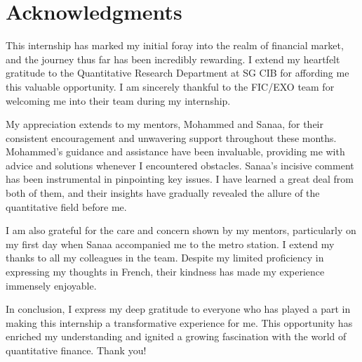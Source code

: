 \cleardoublepage
{}
{}
\chapter*{Acknowledgments}
\vspace{1.0in}
This internship has marked my initial foray into the realm of financial market, and the journey thus far has been incredibly rewarding. I extend my heartfelt gratitude to the Quantitative Research Department at SG CIB for affording me this valuable opportunity. I am sincerely thankful to the FIC/EXO team for welcoming me into their team during my internship.

My appreciation extends to my mentors, Mohammed and Sanaa, for their consistent encouragement and unwavering support throughout these months. Mohammed's guidance and assistance have been invaluable, providing me with advice and solutions whenever I encountered obstacles. Sanaa's incisive comment has been instrumental in pinpointing key issues. I have learned a great deal from both of them, and their insights have gradually revealed the allure of the quantitative field before me.

I am also grateful for the care and concern shown by my mentors, particularly on my first day when Sanaa accompanied me to the metro station. I extend my thanks to all my colleagues in the team. Despite my limited proficiency in expressing my thoughts in French, their kindness has made my experience immensely enjoyable.

In conclusion, I express my deep gratitude to everyone who has played a part in making this internship a transformative experience for me. This opportunity has enriched my understanding and ignited a growing fascination with the world of quantitative finance. Thank you!


\newpage
